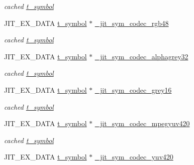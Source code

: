 \begin{DoxyCompactItemize}
\begin{DoxyCompactList}\small\item\em cached \hyperlink{structt__symbol}{t\_\-symbol} \item\end{DoxyCompactList}\item 
\hypertarget{group__jitter_ga13063a55f4d20db871da9ad8eb9b8a35}{
JIT\_\-EX\_\-DATA \hyperlink{structt__symbol}{t\_\-symbol} $\ast$ \hyperlink{group__jitter_ga13063a55f4d20db871da9ad8eb9b8a35}{\_\-jit\_\-sym\_\-codec\_\-rgb48}}
\label{group__jitter_ga13063a55f4d20db871da9ad8eb9b8a35}

\begin{DoxyCompactList}\small\item\em cached \hyperlink{structt__symbol}{t\_\-symbol} \item\end{DoxyCompactList}\item 
\hypertarget{group__jitter_gaea801d63908354bd736781419052964c}{
JIT\_\-EX\_\-DATA \hyperlink{structt__symbol}{t\_\-symbol} $\ast$ \hyperlink{group__jitter_gaea801d63908354bd736781419052964c}{\_\-jit\_\-sym\_\-codec\_\-alphagrey32}}
\label{group__jitter_gaea801d63908354bd736781419052964c}

\begin{DoxyCompactList}\small\item\em cached \hyperlink{structt__symbol}{t\_\-symbol} \item\end{DoxyCompactList}\item 
\hypertarget{group__jitter_gae4b1f3e514247c963bd48e48b94cfd3d}{
JIT\_\-EX\_\-DATA \hyperlink{structt__symbol}{t\_\-symbol} $\ast$ \hyperlink{group__jitter_gae4b1f3e514247c963bd48e48b94cfd3d}{\_\-jit\_\-sym\_\-codec\_\-grey16}}
\label{group__jitter_gae4b1f3e514247c963bd48e48b94cfd3d}

\begin{DoxyCompactList}\small\item\em cached \hyperlink{structt__symbol}{t\_\-symbol} \item\end{DoxyCompactList}\item 
\hypertarget{group__jitter_ga0922adf74aba44b0198b8d789e2fdd00}{
JIT\_\-EX\_\-DATA \hyperlink{structt__symbol}{t\_\-symbol} $\ast$ \hyperlink{group__jitter_ga0922adf74aba44b0198b8d789e2fdd00}{\_\-jit\_\-sym\_\-codec\_\-mpegyuv420}}
\label{group__jitter_ga0922adf74aba44b0198b8d789e2fdd00}

\begin{DoxyCompactList}\small\item\em cached \hyperlink{structt__symbol}{t\_\-symbol} \item\end{DoxyCompactList}\item 
\hypertarget{group__jitter_gaf6f7c7edbb23dc18ace0d67e6b8d1354}{
JIT\_\-EX\_\-DATA \hyperlink{structt__symbol}{t\_\-symbol} $\ast$ \hyperlink{group__jitter_gaf6f7c7edbb23dc18ace0d67e6b8d1354}{\_\-jit\_\-sym\_\-codec\_\-yuv420}}
\label{group__jitter_gaf6f7c7edbb23dc18ace0d67e6b8d1354}


\end{DoxyCompactItemize}
